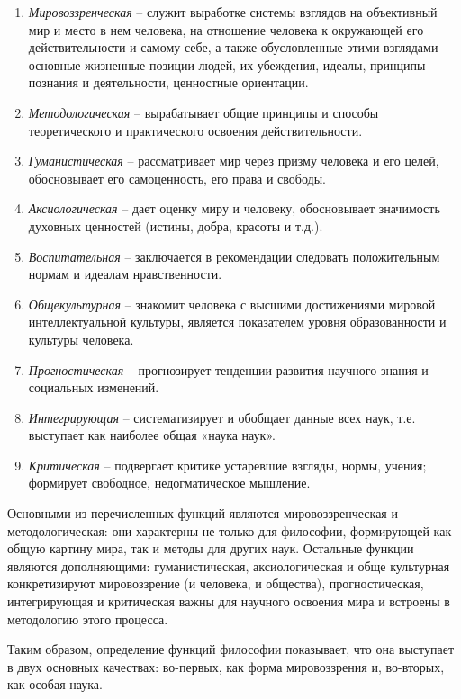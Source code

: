 \documentclass[a4paper, 14pt]{extreport}
\begin{document}
\begin{enumerate}
\def\labelenumi{\arabic{enumi}.}

\item
  \emph{Мировоззренческая} -- служит выработке системы взглядов на
  объективный мир и место в нем человека, на отношение человека к
  окружающей его действительности и самому себе, а также обусловленные
  этими взглядами основные жизненные позиции людей, их убеждения,
  идеалы, принципы познания и деятельности, ценностные ориентации.
\item
  \emph{Методологическая} -- вырабатывает общие принципы и способы
  теоретического и практического освоения действительности.
\item
  \emph{Гуманистическая} -- рассматривает мир через призму человека и
  его целей, обосновывает его самоценность, его права и свободы.
\item
  \emph{Аксиологическая} -- дает оценку миру и человеку, обосновывает
  значимость духовных ценностей (истины, добра, красоты и т.д.).
\item
  \emph{Воспитательная} -- заключается в рекомендации следовать
  положительным нормам и идеалам нравственности.
\item
  \emph{Общекультурная} -- знакомит человека с высшими достижениями
  мировой интеллектуальной культуры, является показателем уровня
  образованности и культуры человека.
\item
  \emph{Прогностическая} -- прогнозирует тенденции развития научного
  знания и социальных изменений.
\item
  \emph{Интегрирующая} -- систематизирует и обобщает данные всех наук,
  т.е. выступает как наиболее общая «наука наук».
\item
  \emph{Критическая} -- подвергает критике устаревшие взгляды, нормы,
  учения; формирует свободное, недогматическое мышление.
\end{enumerate}

Основными из перечисленных функций являются мировоззренческая и
методологическая: они характерны не только для философии, формирующей
как общую картину мира, так и методы для других наук. Остальные функции
являются дополняющими: гуманистическая, аксиологическая и обще
культурная конкретизируют мировоззрение (и человека, и общества),
прогностическая, интегрирующая и критическая важны для научного освоения
мира и встроены в методологию этого процесса.

Таким образом, определение функций философии показывает, что она
выступает в двух основных качествах: во-первых, как форма мировоззрения
и, во-вторых, как особая наука.
\end{document}
